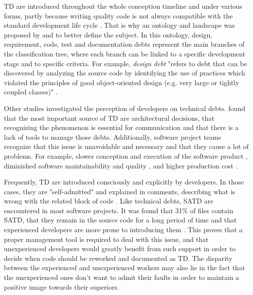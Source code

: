 \ac{TD} are introduced throughout the whole conception timeline and under various forms, partly because writing quality code is not always compatible with the standard development life cycle \citep{brown2010managing}. That is why an ontology and landscape was proposed by \citet{alves2014towards} and \citet{izurieta2012organizing} to better define the subject. In this ontology, design, requirement, code, test and documentation debts represent the main branches of the classification tree, where each branch can be linked to a specific development stage and to specific criteria. For example, \emph{design debt} "refers to debt that can be discovered by analyzing the source code by identifying the use of practices which violated the principles of good object-oriented design (e.g. very large or tightly coupled classes)" \citep{alves2014towards}. \par

Other studies investigated the perception of developers on technical debts. \citet{Ernst:2015:MMI:2786805.2786848} found that the most important source of \ac{TD} are architectural decisions, that recognizing the phenomenon is essential for communication and that there is a lack of tools to manage those debts. Additionally, software project teams recognize that this issue is unavoidable and necessary \citep{lim2012balancing} and that they cause a lot of problems. For example, slower conception and execution of the software product \citep{allman2012managing}, diminished software maintainability and quality \citep{wehaibi2016examining,zazworka2011investigating}, and higher production cost \citep{guo2011tracking}. \par

Frequently, \ac{TD} are introduced consciously and explicitly by developers. In those cases, they are "self-admitted" and explained in comments, describing what is wrong with the related block of code \citep{PotdarS14}. Like technical debts, SATD are encountered in most software projects. It was found that 31\% of files contain \ac{SATD}, that they remain in the source code for a long period of time and that experienced developers are more prone to introducing them \citep{PotdarS14}. This proves that a proper management tool is required to deal with this issue, and that unexperienced developers would greatly benefit from such support in order to decide when code should be reworked and documented as \ac{TD}. The disparity between the experienced and unexperienced workers may also lie in the fact that the unexperienced ones don't want to admit their faults in order to maintain a positive image towards their superiors. \par

